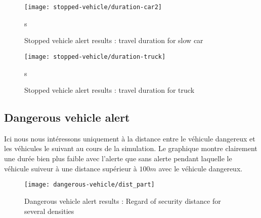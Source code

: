 \documentclass[a4paper,10pt]{article}
\begin{document}
\begin{figure}[h!]
    \begin{center}
         \texttt{[image: stopped-vehicle/duration-car2]}
    \end{center}s
  \caption{ Stopped vehicle alert results : travel duration for slow car}
  \label{fig:ttc_part}
\end{figure}


\begin{figure}[h!]
    \begin{center}
         \texttt{[image: stopped-vehicle/duration-truck]}
    \end{center}s
  \caption{ Stopped vehicle alert results : travel duration for truck}
  \label{fig:ttc_part}
\end{figure}

\FloatBarrier

\subsection{Dangerous vehicle alert}

Ici nous nous intéressons uniquement à la distance entre le véhicule dangereux et les véhicules le suivant au cours de la simulation. Le graphique montre clairement une durée bien plus faible avec l'alerte que sans alerte pendant laquelle le véhicule suiveur à une distance supérieur à $100 m$  avec le véhicule dangereux.

\begin{figure}[h!]
    \begin{center}
         \texttt{[image: dangerous-vehicle/dist\_part]}
    \end{center}
  \caption{ Dangerous vehicle alert results : Regard of security distance for several densities }
  \label{fig:ttc_part}
\end{figure}
\end{document}
